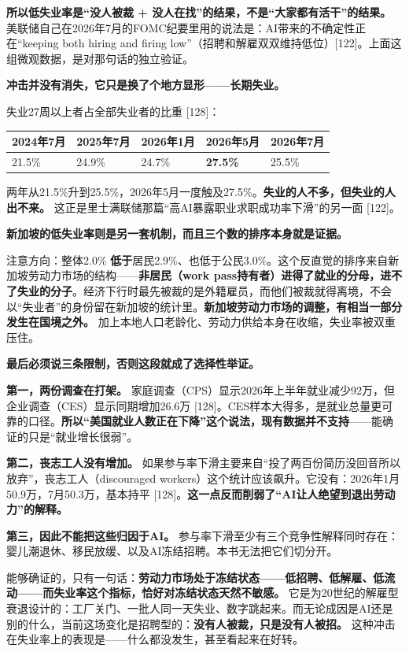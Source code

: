 \documentclass[11pt,a4paper]{ctexart}
\begin{document}
\textbf{所以低失业率是“没人被裁 + 没人在找”的结果，不是“大家都有活干”的结果。} 美联储自己在2026年7月的FOMC纪要里用的说法是：AI带来的不确定性正在“keeping both hiring and firing low”（招聘和解雇双双维持低位）[122]。上面这组微观数据，是对那句话的独立验证。

\textbf{冲击并没有消失，它只是换了个地方显形——长期失业。}

失业27周以上者占全部失业者的比重 [128]：

\begin{center}
\small
\begin{tabularx}{\textwidth}{lXXXX}
\toprule
2024年7月 & 2025年7月 & 2026年1月 & 2026年5月 & 2026年7月 \\
\midrule
21.5\% & 24.9\% & 24.7\% & \textbf{27.5\%} & 25.5\% \\
\bottomrule
\end{tabularx}
\end{center}

两年从21.5\%升到25.5\%，2026年5月一度触及27.5\%。\textbf{失业的人不多，但失业的人出不来。} 这正是里士满联储那篇“高AI暴露职业求职成功率下滑”的另一面 [122]。

\textbf{新加坡的低失业率则是另一套机制，而且三个数的排序本身就是证据。}

注意方向：整体2.0\% \textbf{低于}居民2.9\%、也低于公民3.0\%。这个反直觉的排序来自新加坡劳动力市场的结构——\textbf{非居民（work pass持有者）进得了就业的分母，进不了失业的分子}。经济下行时最先被裁的是外籍雇员，而他们被裁就得离境，不会以“失业者”的身份留在新加坡的统计里。\textbf{新加坡劳动力市场的调整，有相当一部分发生在国境之外。} 加上本地人口老龄化、劳动力供给本身在收缩，失业率被双重压住。

\textbf{最后必须说三条限制，否则这段就成了选择性举证。}

\textbf{第一，两份调查在打架。} 家庭调查（CPS）显示2026年上半年就业减少92万，但企业调查（CES）显示同期增加26.6万 [128]。CES样本大得多，是就业总量更可靠的口径。\textbf{所以“美国就业人数正在下降”这个说法，现有数据并不支持}——能确证的只是“就业增长很弱”。

\textbf{第二，丧志工人没有增加。} 如果参与率下滑主要来自“投了两百份简历没回音所以放弃”，丧志工人（discouraged workers）这个统计应该飙升。它没有：2026年1月50.9万，7月50.3万，基本持平 [128]。\textbf{这一点反而削弱了“AI让人绝望到退出劳动力”的解释。}

\textbf{第三，因此不能把这些归因于AI。} 参与率下滑至少有三个竞争性解释同时存在：婴儿潮退休、移民放缓、以及AI冻结招聘。本书无法把它们切分开。

能够确证的，只有一句话：\textbf{劳动力市场处于冻结状态——低招聘、低解雇、低流动——而失业率这个指标，恰好对冻结状态天然不敏感。} 它是为20世纪的解雇型衰退设计的：工厂关门、一批人同一天失业、数字跳起来。而无论成因是AI还是别的什么，当前这场变化是招聘型的：\textbf{没有人被裁，只是没有人被招。} 这种冲击在失业率上的表现是——什么都没发生，甚至看起来在好转。
\end{document}
